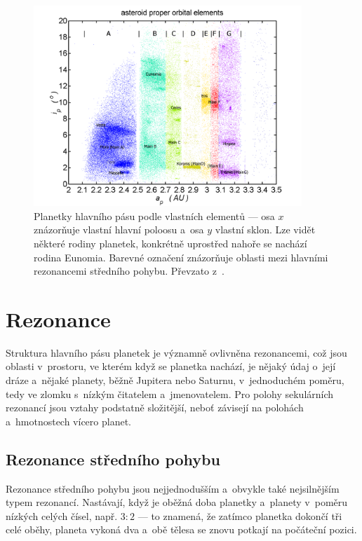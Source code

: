 \documentclass[A4paper, 12pt, oneside]{book}
\begin{document}
\begin{figure}
	\centering
	\includegraphics[width=0.9\textwidth]{obr/mainbelt.png}
	\caption{Planetky hlavního pásu podle vlastních elementů --- osa $x$ znázorňuje vlastní hlavní poloosu a~osa $y$ vlastní sklon. Lze vidět některé rodiny planetek, konkrétně uprostřed nahoře se nachází rodina Eunomia. Barevné označení znázorňuje oblasti mezi hlavními rezonancemi středního pohybu. Převzato z~\cite{wiki:belt}.} \label{fig:belt}
\end{figure}

\pagebreak
\section{Rezonance}
Struktura hlavního pásu planetek je významně ovlivněna rezonancemi, což jsou oblasti v~prostoru, ve kterém když se planetka nachází, je nějaký údaj o~její dráze a~nějaké planety, běžně Jupitera nebo Saturnu, v~jednoduchém poměru, tedy ve zlomku s~nízkým čitatelem a~jmenovatelem. Pro polohy sekulárních rezonancí jsou vztahy podstatně složitější, neboť závisejí na polohách a~hmotnostech vícero planet.
\subsection{Rezonance středního pohybu} \label{sec:meanmotion}

Rezonance středního pohybu jsou nejjednodušším a~obvykle také nejsilnějším typem rezonancí. Nastávají, když je oběžná doba planetky a~planety v~poměru nízkých celých čísel, např. $3:2$ --- to znamená, že zatímco planetka dokončí tři celé oběhy, planeta vykoná dva a~obě tělesa se znovu potkají na počáteční pozici. 
\end{document}
